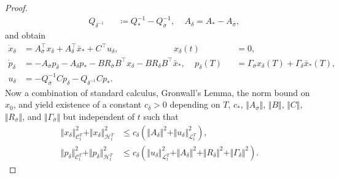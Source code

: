 \documentclass[10pt,a4paper]{amsart}
\begin{document}
\begin{proof}
\begin{equation*}
\begin{alignedat}{3}
        ~~~~~
        Q_{\delta^{-1}} &&\coloneqq Q_*^{-1} - Q_{\bar{\sigma}}^{-1},
        ~~~~~
        A_{\delta} = A_* - A_{\bar{\sigma}},
    \end{alignedat}
    \end{equation*}
    and obtain
    \begin{equation*}
    \begin{alignedat}{2}
        \dot{x}_{\delta} 
        &= A_{\bar{\sigma}}^\top x_{\delta}
            + A_{\delta}^\top \bar{x}_*
            + C^\top u_{\delta},
        ~~~~~
        ~~~~~
        ~~~~~
        ~~~~~
        ~~~~~
        ~~~~
        x_{\delta} (t) &&= 0,\\
        \dot{p}_{\delta}
        &= - A_{\bar{\sigma}} p_{\delta} 
            - A_{\delta} p_* 
            - B R_{\bar{\sigma}} B^\top x_{\delta}
            - B R_{\delta} B^\top \bar{x}_*,
        ~~~~~
        p_{\delta} (T) 
        &&= \Gamma_{\bar{\sigma}} x_{\delta} (T)
            + \Gamma_{\delta} \bar{x}_*(T),\\
        u_{\delta} 
        &= - Q_{\bar{\sigma}}^{-1} C p_{\delta} 
            - Q_{\delta^{-1}} C p_*.
    \end{alignedat}
    \end{equation*}
    Now a combination of standard calculus, Gronwall's Lemma, the norm bound on $x_0$, and  yield existence of a constant $c_\delta>0$ depending on $T$, $c_*$, $\Vert A_{\bar{\sigma}} \Vert$, $\Vert B \Vert$, $\Vert C\Vert$, $\Vert R_{\bar{\sigma}} \Vert$, and $\Vert \Gamma_{\bar{\sigma}} \Vert$ but independent of $t$ such that
    \begin{equation}\label{eq: est_x_p_delta}
    \begin{aligned}
        \Vert x_{\delta} \Vert_{\mathcal{C}_t^T}^2
        +
    	\Vert x_{\delta} \Vert_{\mathcal{H}_t^T}^2
    	&\leq c_\delta \left( \Vert A_\delta \Vert^2 
    	+ 
    	\Vert u_\delta \Vert_{\mathcal{L}_t^T}^2 \right),\\
        \Vert p_\delta \Vert_{\mathcal{C}_t^T}^2
        +
    	\Vert p_\delta \Vert_{\mathcal{H}_t^T}^2	
    	&\leq c_\delta \left(
    	\Vert u_\delta \Vert_{\mathcal{L}_t^T}^2
    	+ 
    	\Vert A_\delta \Vert^2 
    	+ 
    	\Vert R_\delta \Vert^2 
    	+
    	\Vert \Gamma_\delta \Vert^2 
    	\right).
    \end{aligned}
    \end{equation}
    

\end{proof}
\end{document}
